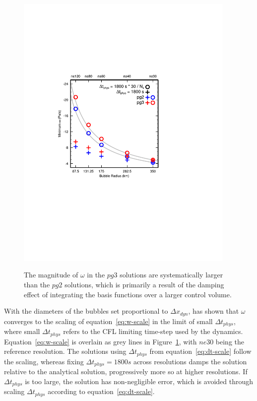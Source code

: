 \documentclass{agujournal}
\begin{document}
\begin{figure}[t]
\begin{center}
\noindent\includegraphics[width=25pc,angle=0]{bubble_test.pdf}\\
\end{center}
\caption{The magnitude of $\omega$ in the $pg3$ solutions are systematically larger than the $pg2$ solutions, which is primarily a result of the damping effect of integrating the basis functions over a larger control volume.}
\label{fig:bubble}
\end{figure}

With the diameters of the bubbles set proportional to $\Delta x_{dyn}$, \cite{HR2018JAMES} has shown that $\omega$ converges to the scaling of equation~\eqref{eq:w-scale} in the limit of small $\Delta t_{phys}$, where small $\Delta t_{phys}$ refers to the CFL limiting time-step used by the dynamics. Equation~\eqref{eq:w-scale} is overlain as grey lines in Figure~\ref{fig:bubble}, with $ne30$ being the reference resolution. The solutions using $\Delta t_{phys}$ from equation~\eqref{eq:dt-scale} follow the scaling, whereas fixing $\Delta t_{phys} = 1800s$ across resolutions damps the solution relative to the analytical solution, progressively more so at higher resolutions. If $\Delta t_{phys}$ is too large, the solution has non-negligible error, which is avoided through scaling $\Delta t_{phys}$ according to equation~\eqref{eq:dt-scale}.
\end{document}
